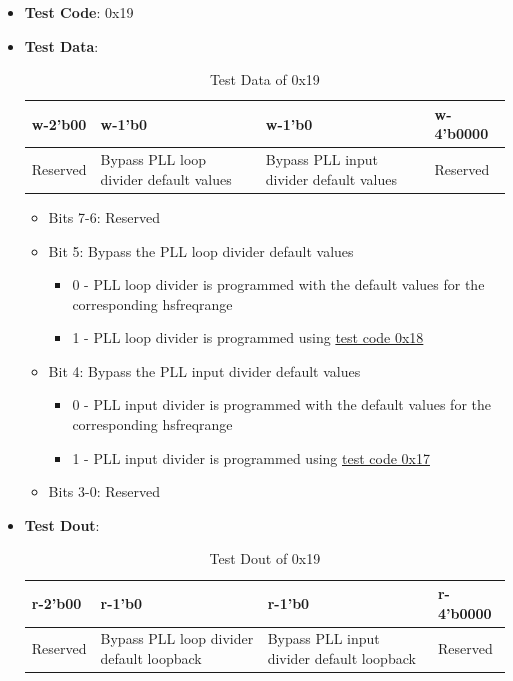 \documentclass[main\_\_EN.tex]{subfiles}
\begin{document}
\begin{itemize}
    \item \textbf{Test Code}: 0x19
    \item \textbf{Test Data}: 
        \begin{longtable}{ |p{2cm}|p{5cm}|p{5cm}|p{2cm}|}
            \caption{Test Data of 0x19}
            \label{tab:test-data-0x19} \\
            \hline
            \rowcolor{lightgray}
            \textbf{w-2'b00} & \textbf{w-1'b0} & \textbf{w-1'b0} & \textbf{w-4'b0000} \\ \hline
            Reserved & Bypass PLL loop divider default values & Bypass PLL input divider default values & Reserved \\ \hline
        \end{longtable}
        \begin{itemize}
            \item Bits 7-6: Reserved
            \item Bit 5: Bypass the PLL loop divider default values
                \begin{itemize}
                    \item 0 - PLL loop divider is programmed with the default values for the corresponding hsfreqrange
                    \item 1 - PLL loop divider is programmed using \hyperref[sec:test-code-0x18]{test code 0x18}
                \end{itemize}
            \item Bit 4: Bypass the PLL input divider default values
                \begin{itemize}
                    \item 0 - PLL input divider is programmed with the default values for the corresponding hsfreqrange
                    \item 1 - PLL input divider is programmed using \hyperref[sec:test-code-0x17]{test code 0x17}
                \end{itemize}
            \item Bits 3-0: Reserved
        \end{itemize}
    \item \textbf{Test Dout}:
        \begin{longtable}{ |p{2cm}|p{5cm}|p{5cm}|p{2cm}|}
            \caption{Test Dout of 0x19}
            \label{tab:test-dout-0x19} \\
            \hline
            \rowcolor{lightgray}
            \textbf{r-2'b00} & \textbf{r-1'b0} & \textbf{r-1'b0} & \textbf{r-4'b0000} \\ \hline
            Reserved & Bypass PLL loop divider default loopback & Bypass PLL input divider default loopback & Reserved \\ \hline
        \end{longtable}
\end{itemize}
\end{document}
